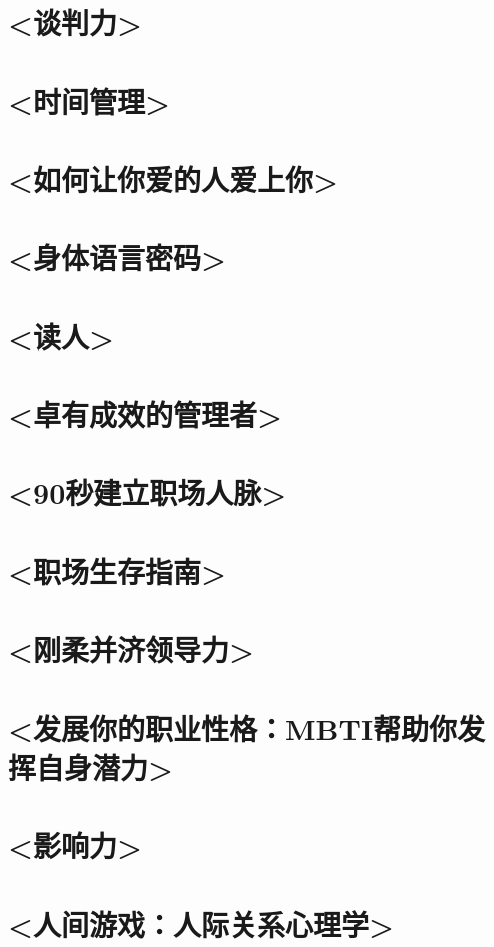 \documentclass[UTF8,a4paper,8pt]{ctexbook}
\begin{document}
	\section{<谈判力>}
	
	\section{<时间管理>}
	
	\section{<如何让你爱的人爱上你>}
	
	\section{<身体语言密码>}
	
	\section{<读人>}
	
	\section{<卓有成效的管理者>}
	
	\section{<90秒建立职场人脉>}
	
	\section{<职场生存指南>}
	
	\section{<刚柔并济领导力>}
	
	\section{<发展你的职业性格：MBTI帮助你发挥自身潜力>}
	
	\section{<影响力>}
	
	\section{<人间游戏：人际关系心理学>}
		    
\end{document}
